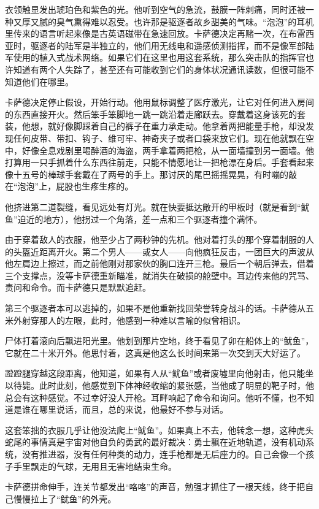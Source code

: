 \documentclass[AutoFakeBold=true]{book}
\begin{document}
衣领触显发出琥珀色和紫色的光。他听到空气的急流，鼓膜一阵刺痛，同时还被一种又厚又腻的臭气熏得难以忍受。也许那是驱逐者故乡甜美的气味。``泡泡''的耳机里传来的语言听起来像是古英语磁带在急速回放。卡萨德决定再赌一次，在布雷西亚时，驱逐者的陆军是半独立的，他们用无线电和遥感侦测指挥，而不是像军部陆军使用的植入式战术网络。如果它们在这里也用这套系统，那么突击队的指挥官也许知道有两个人失踪了，甚至还有可能收到它们的身体状况通讯读数，但很可能不知道他们在哪里。

卡萨德决定停止假设，开始行动。他用鼠标调整了医疗激光，让它对任何进入房间的东西直接开火。然后笨手笨脚地一跳一跳沿着走廊跃去。穿戴着这身该死的套装，他想，就好像脚踩着自己的裤子在重力承走动。他拿着两把能量手枪，却没发现任何皮带、带扣、钩子、维可牢、神奇夹子或者口袋来放它们。现在他就飘在空中，好像全息戏剧里喝醉酒的海盗，两手拿着两把枪，从一面墙撞到另一面墙。他打算用一只手抓着什么东西往前走，只能不情愿地让一把枪漂在身后。手套看起来像十五号的棒球手套戴在了两号的手上。那讨厌的尾巴摇摇晃晃，有时嘣的敲在``泡泡''上，屁股也生疼生疼的。

他挤进第二道裂缝，看见远处有灯光。就在快要抵达敞开的甲板时（就是看到``鱿鱼''迫近的地方），他拐过一个角落，差一点和三个驱逐者撞个满怀。

由于穿着敌人的衣服，他至少占了两秒钟的先机。他对着打头的那个穿着制服的人的头盔近距离开火。第二个男人——或女人——向他疯狂反击，一团巨大的声波从他左肩边上擦过，而之前他刚对那家伙的胸口连开三枪。最后一个朝后弹去，借着三个支撑点，没等卡萨德重新瞄准，就消失在破损的舱壁中。耳边传来他的咒骂、责问和命令。而卡萨德只是默默追赶。

第三个驱逐者本可以逃掉的，如果不是他重新找回荣誉转身战斗的话。卡萨德从五米外射穿那人的左眼，此时，他感到一种难以言喻的似曾相识。

尸体打着滚向后飘进阳光里。他划到那片空地，终于看见了卯在船体上的``鱿鱼''，它就在二十米开外。他思忖着，这真是他这么长时间来第一次交到天大好运了。

蹬蹬腿穿越这段距离，他知道，如果有人从``鱿鱼''或者废墟里向他射击，他只能坐以待毙。此时此刻，他感觉到下体神经收缩的紧张感，当他成了明显的靶子时，他总会有这种感觉。不过幸好没人开枪。耳畔响起了命令和询问。他听不懂，也不知道是谁在哪里说话，而且，总的来说，他最好不参与对话。

这套笨拙的衣服几乎让他没法爬上``鱿鱼''。如果真上不去，他转念一想，这种虎头蛇尾的事情真是宇宙对他自负的勇武的最好裁决：勇士飘在近地轨道，没有机动系统，没有推进器，没有任何种类的动力，连手枪都是无后座力的。自己会像一个孩子手里飘走的气球，无用且无害地结束生命。

卡萨德拼命伸手，连关节都发出``咯咯''的声音，勉强才抓住了一根天线，终于把自己慢慢拉上了``鱿鱼''的外壳。
\end{document}
